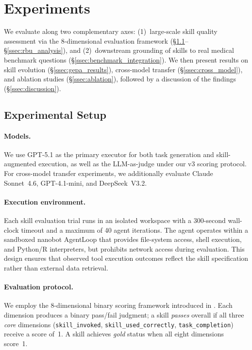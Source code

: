 
\section{Experiments}
\label{sec:experiments}

We evaluate \medskille along two complementary axes:
(1)~large-scale skill quality assessment via the 8-dimensional \medskillbench evaluation framework (\S\ref{ssec:setup}--\S\ref{ssec:rbu_analysis}), and
(2)~downstream grounding of skills to real medical benchmark questions (\S\ref{ssec:benchmark_integration}).
We then present results on \gepamed skill evolution (\S\ref{ssec:gepa_results}), cross-model transfer (\S\ref{ssec:cross_model}), and ablation studies (\S\ref{ssec:ablation}), followed by a discussion of the findings (\S\ref{ssec:discussion}).

\subsection{Experimental Setup}
\label{ssec:setup}

\paragraph{Models.}
We use GPT-5.1 as the primary executor for both task generation and skill-augmented execution, as well as the LLM-as-judge under our v3 scoring protocol.
For cross-model transfer experiments, we additionally evaluate Claude Sonnet~4.6, GPT-4.1-mini, and DeepSeek~V3.2.

\paragraph{Execution environment.}
Each skill evaluation trial runs in an isolated workspace with a 300-second wall-clock timeout and a maximum of 40 agent iterations.
The agent operates within a sandboxed nanobot AgentLoop that provides file-system access, shell execution, and Python/R interpreters, but prohibits network access during evaluation.
This design ensures that observed tool execution outcomes reflect the skill specification rather than external data retrieval.

\paragraph{Evaluation protocol.}
We employ the 8-dimensional binary scoring framework introduced in .
Each dimension produces a binary pass/fail judgment; a skill \emph{passes} overall if all three \emph{core} dimensions (\texttt{skill\_invoked}, \texttt{skill\_used\_correctly}, \texttt{task\_completion}) receive a score of~1.
A skill achieves \emph{gold} status when all eight dimensions score~1.

